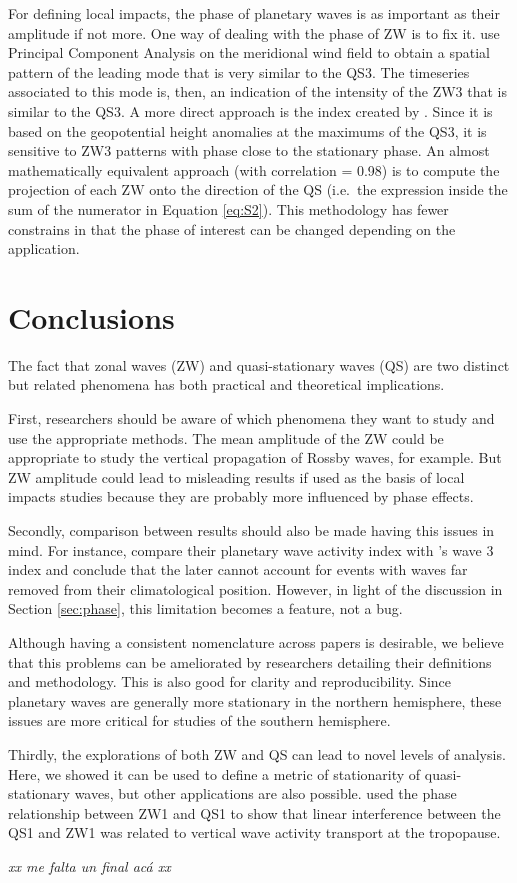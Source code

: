 \documentclass[draft,linenumbers]{agujournal2018}
\begin{document}
For defining local impacts, the phase of planetary waves is as important
as their amplitude if not more. One way of dealing with the phase of ZW
is to fix it. \citet{Yuan2008} use Principal Component Analysis on the
meridional wind field to obtain a spatial pattern of the leading mode
that is very similar to the QS3. The timeseries associated to this mode
is, then, an indication of the intensity of the ZW3 that is similar to
the QS3. A more direct approach is the index created by
\citet{Raphael2004}. Since it is based on the geopotential height
anomalies at the maximums of the QS3, it is sensitive to ZW3 patterns
with phase close to the stationary phase. An almost mathematically
equivalent approach (with correlation = 0.98) is to compute the
projection of each \(\mathrm{ZW}\) onto the direction of the
\(\mathrm{QS}\) (i.e.~the expression inside the sum of the numerator in
Equation \ref{eq:S2}). This methodology has fewer constrains in that the
phase of interest can be changed depending on the application.

\section{Conclusions}

The fact that zonal waves (ZW) and quasi-stationary waves (QS) are two
distinct but related phenomena has both practical and theoretical
implications.

First, researchers should be aware of which phenomena they want to study
and use the appropriate methods. The mean amplitude of the ZW could be
appropriate to study the vertical propagation of Rossby waves, for
example. But ZW amplitude could lead to misleading results if used as
the basis of local impacts studies because they are probably more
influenced by phase effects.

Secondly, comparison between results should also be made having this
issues in mind. For instance, \citet{Irving2015} compare their planetary
wave activity index with \citet{Raphael2004}'s wave 3 index and conclude
that the later cannot account for events with waves far removed from
their climatological position. However, in light of the discussion in
Section \ref{sec:phase}, this limitation becomes a feature, not a bug.

Although having a consistent nomenclature across papers is desirable, we
believe that this problems can be ameliorated by researchers detailing
their definitions and methodology. This is also good for clarity and
reproducibility. Since planetary waves are generally more stationary in
the northern hemisphere, these issues are more critical for studies of
the southern hemisphere.

Thirdly, the explorations of both ZW and QS can lead to novel levels of
analysis. Here, we showed it can be used to define a metric of
stationarity of quasi-stationary waves, but other applications are also
possible. \citet{Smith2012} used the phase relationship between ZW1 and
QS1 to show that linear interference between the QS1 and ZW1 was related
to vertical wave activity transport at the tropopause.

\emph{xx me falta un final acá xx}


\end{document}
